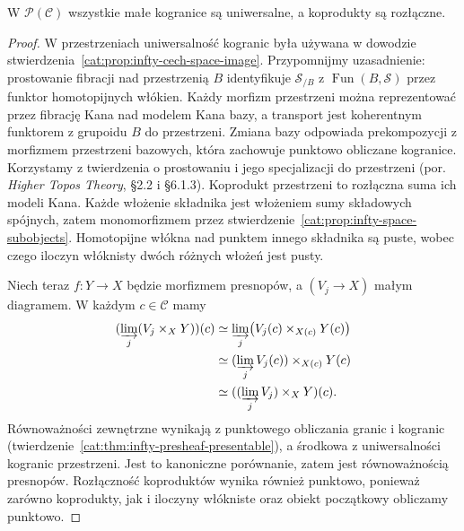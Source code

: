 \begin{stwierdzenie}\label{cat:prop:infty-presheaf-universal-disjoint}
W $\mathcal P(\mathcal C)$ wszystkie małe kogranice są uniwersalne, a koprodukty są rozłączne.
\end{stwierdzenie}
\begin{proof}
W przestrzeniach uniwersalność kogranic była używana w dowodzie stwierdzenia~\ref{cat:prop:infty-cech-space-image}. Przypomnijmy uzasadnienie: prostowanie fibracji nad przestrzenią $B$ identyfikuje $\mathcal S_{/B}$ z $\operatorname{Fun}(B,\mathcal S)$ przez funktor homotopijnych włókien. Każdy morfizm przestrzeni można reprezentować przez fibrację Kana nad modelem Kana bazy, a transport jest koherentnym funktorem z grupoidu $B$ do przestrzeni. Zmiana bazy odpowiada prekompozycji z morfizmem przestrzeni bazowych, która zachowuje punktowo obliczane kogranice. Korzystamy z twierdzenia o prostowaniu i jego specjalizacji do przestrzeni (por. \emph{Higher Topos Theory}, \S2.2 i \S6.1.3). Koprodukt przestrzeni to rozłączna suma ich modeli Kana. Każde włożenie składnika jest włożeniem sumy składowych spójnych, zatem monomorfizmem przez stwierdzenie~\ref{cat:prop:infty-space-subobjects}. Homotopijne włókna nad punktem innego składnika są puste, wobec czego iloczyn włóknisty dwóch różnych włożeń jest pusty.

Niech teraz $f:Y\to X$ będzie morfizmem presnopów, a $(V_j\to X)$ małym diagramem. W każdym $c\in\mathcal C$ mamy
\[
\begin{aligned}
 (\varinjlim_j(V_j\times_XY))(c)
 &\simeq\varinjlim_j\bigl(V_j(c)\times_{X(c)}Y(c)\bigr)\\
 &\simeq(\varinjlim_j V_j(c))\times_{X(c)}Y(c)\\
 &\simeq((\varinjlim_jV_j)\times_XY)(c).
\end{aligned}
\]
Równoważności zewnętrzne wynikają z punktowego obliczania granic i kogranic (twierdzenie~\ref{cat:thm:infty-presheaf-presentable}), a środkowa z uniwersalności kogranic przestrzeni. Jest to kanoniczne porównanie, zatem jest równoważnością presnopów. Rozłączność koproduktów wynika również punktowo, ponieważ zarówno koprodukty, jak i iloczyny włókniste oraz obiekt początkowy obliczamy punktowo.
\end{proof}


